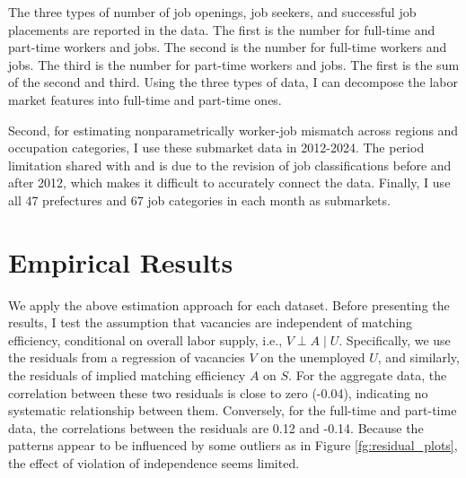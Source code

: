 \documentclass[12pt]{article}
\begin{document}
The three types of number of job openings, job seekers, and successful job placements are reported in the data. 
The first is the number for full-time and part-time workers and jobs.
The second is the number for full-time workers and jobs.
The third is the number for part-time workers and jobs.
The first is the sum of the second and third.
Using the three types of data, I can decompose the labor market features into full-time and part-time ones.

Second, for estimating nonparametrically worker-job mismatch across regions and occupation categories, I use these submarket data in 2012-2024. 
The period limitation shared with \cite{kawata2019} and \cite{higashi2018spatial} is due to the revision of job classifications before and after 2012, which makes it difficult to accurately connect the data. 
Finally, I use all 47 prefectures and 67 job categories in each month as submarkets.



\section{Empirical Results}
We apply the above estimation approach for each dataset.
Before presenting the results, I test the assumption that vacancies are independent of matching efficiency, conditional on overall labor supply, i.e., \( V \perp A \mid U \). 
Specifically, we use the residuals from a regression of vacancies \( V \) on the unemployed \( U \), and similarly, the residuals of implied matching efficiency \( A \) on \( S \).
For the aggregate data, the correlation between these two residuals is close to zero (-0.04), indicating no systematic relationship between them.
Conversely, for the full-time and part-time data, the correlations between the residuals are 0.12 and -0.14.
Because the patterns appear to be influenced by some outliers as in Figure \ref{fg:residual_plots}, the effect of violation of independence seems limited.
\end{document}
